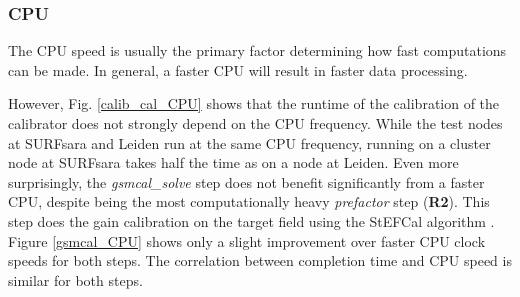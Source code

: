 \subsubsection{CPU}
The CPU speed is usually the primary factor determining how fast computations can be made. In general, a faster CPU will result in faster data processing. 

However, Fig. \ref{calib_cal_CPU} shows that the runtime of the calibration of the calibrator does not strongly depend on the CPU frequency. While the test nodes at SURFsara and Leiden run at the same CPU frequency, running on a cluster node at SURFsara takes half the time as on a node at Leiden. Even more surprisingly, the \textit{gsmcal\_solve} step does not benefit significantly from a faster CPU, despite being the most computationally heavy \textit{prefactor} step (\textbf{R2}). This step does the gain calibration on the target field using the StEFCal algorithm \citep{stefcal}. Figure \ref{gsmcal_CPU} shows only a slight improvement over faster CPU clock speeds for both steps. The correlation between completion time and CPU speed is similar for both steps.

